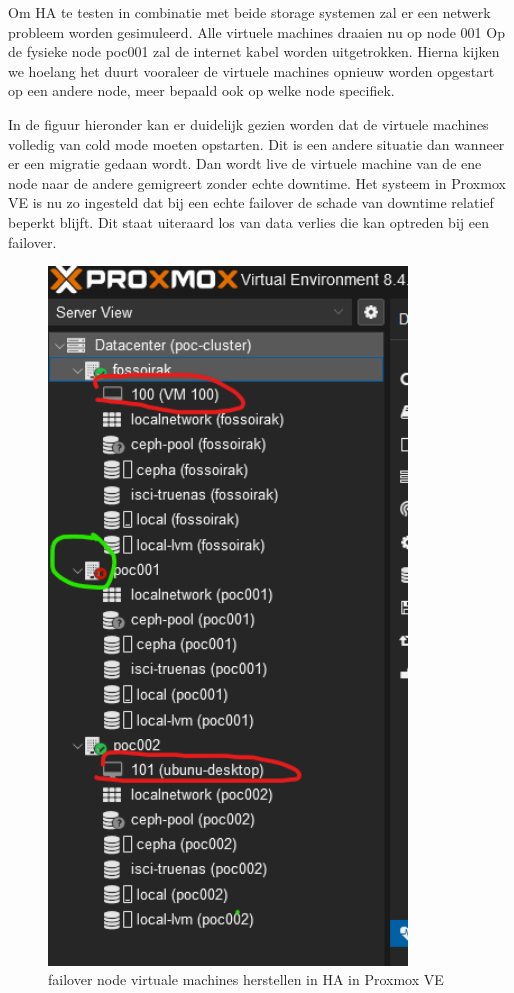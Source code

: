 Om HA te testen in combinatie met beide storage systemen zal er een netwerk probleem worden gesimuleerd.
Alle virtuele machines draaien nu op node 001
Op de fysieke node poc001 zal de internet kabel worden uitgetrokken. Hierna kijken we hoelang het duurt vooraleer de virtuele machines opnieuw worden opgestart op een andere node, meer bepaald ook op welke node specifiek.

In de figuur hieronder kan er duidelijk gezien worden dat de virtuele machines volledig van cold mode moeten opstarten. Dit is een andere situatie dan wanneer er een migratie gedaan wordt. Dan wordt live de virtuele machine van de ene node naar de andere gemigreert zonder echte downtime.
Het systeem in Proxmox VE is nu zo ingesteld dat bij een echte failover de schade van downtime relatief beperkt blijft. Dit staat uiteraard los van data verlies die kan optreden bij een failover.
\begin{figure}[H]
  \centering
  \includegraphics[width=0.85\textwidth]{../poc/failover-prox.png}
  \caption{failover node virtuale machines herstellen in HA in Proxmox VE}
  \label{fig:failover-vm}
\end{figure}

